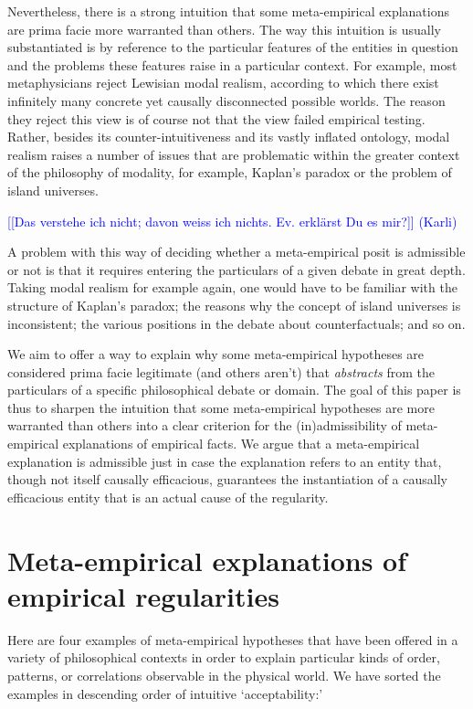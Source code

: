 \documentclass[a4paper,12pt]{article}
\newcommand{\karli}[1]{\textcolor{blue}{#1 (Karli)}}
\begin{document}
Nevertheless, there is a strong intuition that some meta-empirical explanations are prima facie more warranted than others. The way this intuition is usually substantiated is by reference to the particular features of the entities in question and the problems these features raise in a particular context. For example, most metaphysicians reject Lewisian modal realism, according to which there exist infinitely many concrete yet causally disconnected possible worlds. The reason they reject this view is of course not that the view failed empirical testing. Rather, besides its counter-intuitiveness and its vastly inflated ontology, modal realism raises a number of issues that are problematic within the greater context of the philosophy of modality, for example, Kaplan's paradox or the problem of island universes.

\karli{[[Das verstehe ich nicht; davon weiss ich nichts. Ev. erkl\"arst Du es mir?]]}

A problem with this way of deciding whether a meta-empirical posit is admissible or not is that it requires entering the particulars of a given debate in great depth. Taking modal realism for example again, one would have to be familiar with the structure of Kaplan's paradox; the reasons why the concept of island universes is inconsistent; the various positions in the debate about counterfactuals; and so on.

We aim to offer a way to explain why some meta-empirical hypotheses are considered prima facie legitimate (and others aren't) that \textit{abstracts} from the particulars of a specific philosophical debate or domain. The goal of this paper is thus to sharpen the intuition that some meta-empirical hypotheses are more warranted than others into a clear criterion for the (in)admissibility of meta-empirical explanations of empirical facts. We argue that a meta-empirical explanation is admissible just in case the explanation refers to an entity that, though not itself causally efficacious, guarantees the instantiation of a causally efficacious entity that is an actual cause of the regularity.

\section{Meta-empirical explanations of empirical regularities}

Here are four examples of meta-empirical hypotheses that have been offered in a variety of philosophical contexts in order to explain particular kinds of order, patterns, or correlations observable in the physical world. We have sorted the examples in descending order of intuitive `acceptability:'
\end{document}
